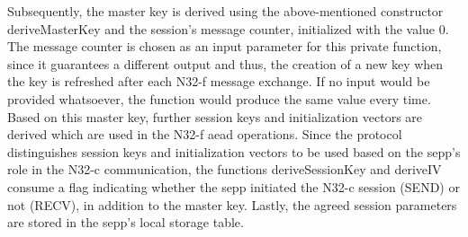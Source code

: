 Subsequently, the master key is derived using the above-mentioned constructor {\sffamily deriveMasterKey} and the session's message counter, initialized with the value 0.
The message counter is chosen as an input parameter for this private function, since it guarantees a different output and thus, the creation of a new key when the key is refreshed after each N32-f message exchange.
If no input would be provided whatsoever, the function would produce the same value every time.
Based on this master key, further session keys and initialization vectors are derived which are used in the N32-f \gls{aead} operations.
Since the protocol distinguishes session keys and initialization vectors to be used based on the \gls{sepp}'s role in the N32-c communication, the functions {\sffamily deriveSessionKey} and {\sffamily deriveIV} consume a flag indicating whether the \gls{sepp} initiated the N32-c session ({\sffamily SEND}) or not ({\sffamily RECV}), in addition to the master key.
Lastly, the agreed session parameters are stored in the \gls{sepp}'s local storage table.

